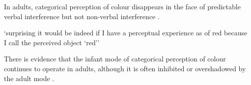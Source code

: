 \documentclass[12pt]{extarticle}
\begin{document}
\begin{multicols}{3}
In adults, categorical perception of colour disappears in the face of predictable verbal interference but not non-verbal interference
\citep{Roberson:2000ge,Pilling:2003bi,Wiggett:2008xt}.
 
‘surprising it would be indeed if I have a perceptual experience as of red because I call the perceived object ‘red’’
\citep[pp.\ 324--5]{Stokes:2006fd}
 
There is evidence that the infant mode of categorical perception of colour continues to operate in adults, although it is often inhibited or overshadowed by the adult mode \citep{Gilbert:2006yb}.
 


 

 
\footnotesize 


\end{multicols}
\end{document}
